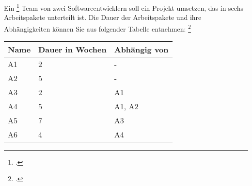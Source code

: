 \documentclass{bschlangaul-aufgabe}
\begin{document}

\let\f=\footnotesize
\let\FZ=\bCpmFruehI
\let\SZ=\bCpmSpaetI
\let\v=\bCpmVon
\let\vz=\bCpmVonZu
\let\z=\bCpmZu

Ein \footcite[erweiterte Aufgabenstellung, Seite
2]{sosy:ab:5} Team von zwei Softwareentwicklern soll ein Projekt
umsetzen, das in sechs Arbeitspakete unterteilt ist. Die Dauer der
Arbeitspakete und ihre Abhängigkeiten können Sie aus folgender Tabelle
entnehmen:
\footcite[Thema 2 Teilaufgabe 1 Aufgabe 1]{examen:66116:2018:09}

\begin{center}
\begin{tabular}{|l|l|l|}
\hline
Name & Dauer in Wochen & Abhängig von\\\hline\hline
A1 & 2 & - \\\hline
A2 & 5 & - \\\hline
A3 & 2 & A1 \\\hline
A4 & 5 & A1, A2 \\\hline
A5 & 7 & A3 \\\hline
A6 & 4 & A4 \\\hline
\end{tabular}
\end{center}
\end{document}
